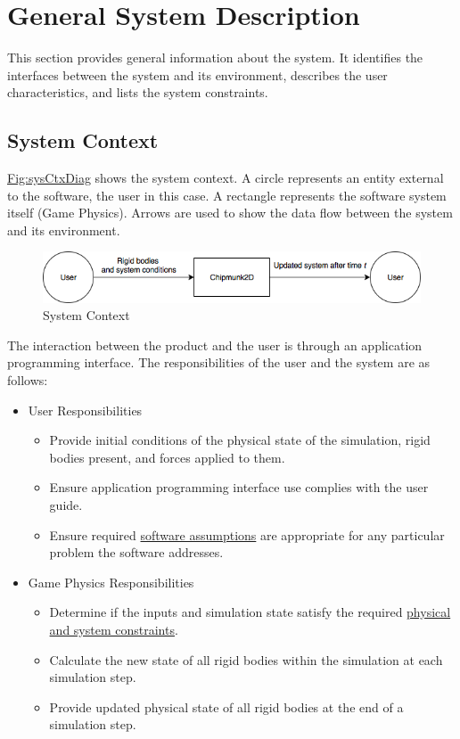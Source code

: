 \documentclass[12pt]{article}
\begin{document}
\section{General System Description}
\label{Sec:GenSysDesc}
This section provides general information about the system. It identifies the interfaces between the system and its environment, describes the user characteristics, and lists the system constraints.

\subsection{System Context}
\label{Sec:SysContext}
\hyperref[Figure:sysCtxDiag]{Fig:sysCtxDiag} shows the system context. A circle represents an entity external to the software, the user in this case. A rectangle represents the software system itself (Game Physics). Arrows are used to show the data flow between the system and its environment.

\begin{figure}
\begin{center}
\includegraphics[width=\textwidth]{../../../../datafiles/gamephysics/sysctx.png}
\caption{System Context}
\label{Figure:sysCtxDiag}
\end{center}
\end{figure}
The interaction between the product and the user is through an application programming interface. The responsibilities of the user and the system are as follows:

\begin{itemize}
\item{User Responsibilities}
\begin{itemize}
\item{Provide initial conditions of the physical state of the simulation, rigid bodies present, and forces applied to them.}
\item{Ensure application programming interface use complies with the user guide.}
\item{Ensure required \hyperref[Sec:Assumps]{software assumptions} are appropriate for any particular problem the software addresses.}
\end{itemize}
\item{Game Physics Responsibilities}
\begin{itemize}
\item{Determine if the inputs and simulation state satisfy the required \hyperref[Sec:DataConstraints]{physical and system constraints}.}
\item{Calculate the new state of all rigid bodies within the simulation at each simulation step.}
\item{Provide updated physical state of all rigid bodies at the end of a simulation step.}
\end{itemize}
\end{itemize}
\end{document}
